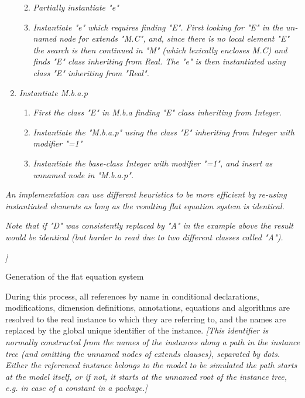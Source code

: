 \documentclass[10pt,a4paper]{report}
\renewcommand{\labelenumi}{\arabic{enumi}.}
\renewcommand{\labelenumii}{\labelenumi\arabic{enumii}.}
\begin{document}
\begin{enumerate}
  \begin{enumerate}
  \def\labelenumii{\arabic{enumii}.}
  \item
    \emph{Partially instantiate "e"}
  \item
    \emph{Instantiate "e" which requires finding "E". First looking for
    "E" in the un-named node for extends "M.C", and, since there is no
    local element "E" the search is then continued in "M" (which
    lexically encloses M.C) and finds "E" class inheriting from Real.
    The "e" is then instantiated using class "E" inheriting from
    "Real".}
  \end{enumerate}
\item
  \emph{Instantiate M.b.a.p}

  \begin{enumerate}
  \item
    \emph{First the class "E" in M.b.a finding "E" class inheriting from
    Integer.}
  \item
    \emph{Instantiate the "M.b.a.p" using the class "E" inheriting from
    Integer with modifier "=1"}
  \item
    \emph{Instantiate the base-class Integer with modifier "=1", and
    insert as unnamed node in "M.b.a.p".}
  \end{enumerate}
\end{enumerate}

\emph{An implementation can use different heuristics to be more
efficient by re-using instantiated elements as long as the resulting
flat equation system is identical. }

\emph{Note that if "D" was consistently replaced by "A" in the example
above the result would be identical (but harder to read due to two
different classes called "A"). }

\emph{{]}}

Generation of the flat equation system

During this process, all references by name in conditional declarations,
modifications, dimension definitions, annotations, equations and
algorithms are resolved to the real instance to which they are referring
to, and the names are replaced by the global unique identifier of the
instance. \emph{{[}This identifier is normally constructed from the
names of the instances along a path in the instance tree (and omitting
the unnamed nodes of extends clauses), separated by dots. Either the
referenced instance belongs to the model to be simulated the path starts
at the model itself, or if not, it starts at the unnamed root of the
instance tree, e.g. in case of a constant in a package.{]}}
\end{document}
